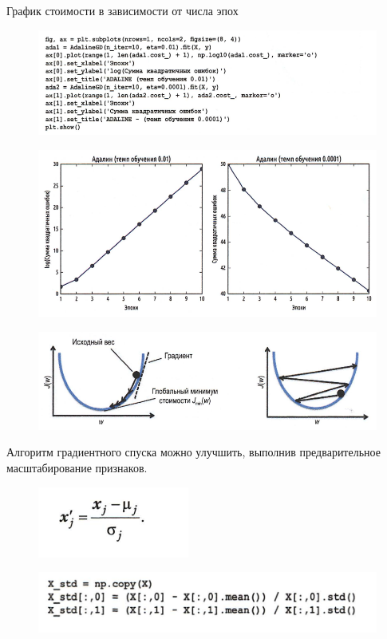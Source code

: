 \documentclass{beamer}
\begin{document}
\begin{frame}[t]{График стоимости в зависимости от числа эпох}
\begin{figure}[h]
\centering
\includegraphics[scale=0.4]{images/lec03-pic25.png}
\end{figure}
\begin{figure}[h]
\centering
\includegraphics[scale=0.4]{images/lec03-pic26.png}
\end{figure}
\end{frame}

\begin{frame}[t]
\begin{figure}[h]
\centering
\includegraphics[scale=0.6]{images/lec03-pic27.png}
\end{figure}
Алгоритм градиентного спуска можно улучшить, выполнив предварительное масштабирование признаков. 
\begin{figure}[h]
\centering
\includegraphics[scale=0.6]{images/lec03-pic28.png}
\end{figure}
\begin{figure}[h]
\centering
\includegraphics[scale=0.6]{images/lec03-pic29.png}
\end{figure}
\end{frame}
\end{document}

